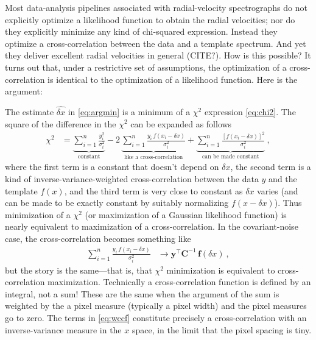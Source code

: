 \documentclass[modern]{aastex631}
\newcommand{\lao}[1]{\boldsymbol{#1}}
\newcommand{\vy}{\lao{y}}
\newcommand{\vf}{\lao{f}}
\newcommand{\vC}{\lao{C}}
\begin{document}
Most data-analysis pipelines associated with radial-velocity spectrographs do not explicitly optimize a likelihood function to obtain the radial velocities; nor do they explicitly minimize any kind of chi-squared expression.
Instead they optimize a cross-correlation between the data and a template spectrum.
And yet they deliver excellent radial velocities in general (CITE?).
How is this possible?
It turns out that, under a restrictive set of assumptions, the optimization of a cross-correlation is identical to the optimization of a likelihood function.
Here is the argument:

The estimate $\widehat{\delta x}$ in \eqref{eq:argmin} is a minimum of a $\chi^2$ expression \eqref{eq:chi2}.
The square of the difference in the $\chi^2$ can be expanded as follows
\begin{align}\label{eq:chi2ccf}
    \chi^2 &= \underbrace{\sum_{i=1}^n \frac{y_i^2}{\sigma_i^2}}_{\text{constant}}
         - 2\,\underbrace{\sum_{i=1}^n \frac{y_i\,f(x_i - \delta x)}{\sigma_i^2}}_{\text{like a cross-correlation}}
         +    \underbrace{\sum_{i=1}^n \frac{[f(x_i - \delta x)]^2}{\sigma_i^2}}_{\text{can be made constant}} ~,
\end{align}
where the first term is a constant that doesn't depend on $\delta x$,
the second term is a kind of inverse-variance-weighted cross-correlation between the data $y$ and the template $f(x)$,
and the third term is very close to constant as $\delta x$ varies (and can be made to be exactly constant by suitably normalizing $f(x-\delta x)$).
Thus minimization of a $\chi^2$ (or maximization of a Gaussian likelihood function) is nearly equivalent to maximization of a cross-correlation.
In the covariant-noise case, the cross-correlation becomes something like
\begin{align}
    \sum_{i=1}^n \frac{y_i\,f(x_i - \delta x)}{\sigma_i^2} &\rightarrow \vy^\top\vC^{-1}\,\vf(\delta x)\label{eq:wccf} ~,
\end{align}
but the story is the same---that is, that $\chi^2$ minimization is equivalent to cross-correlation maximization.
Technically a cross-correlation function is defined by an integral, not a sum!
These are the same when the argument of the sum is weighted by the a pixel measure (typically a pixel width) and the pixel measures  go to zero.
The terms in \eqref{eq:wccf} constitute precisely a cross-correlation with an inverse-variance measure in the $x$ space, in the limit that the pixel spacing is tiny.
\end{document}
